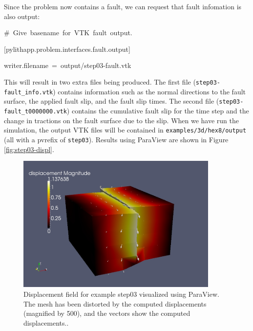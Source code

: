 Since the problem now contains a fault, we can request that fault
infomation is also output:
\begin{lyxcode}
\#~Give~basename~for~VTK~fault~output.

{[}pylithapp.problem.interfaces.fault.output{]}

writer.filename~=~output/step03-fault.vtk~
\end{lyxcode}
This will result in two extra files being produced. The first file
(\texttt{step03-fault\_info.vtk}) contains information such as the
normal directions to the fault surface, the applied fault slip, and
the fault slip times. The second file (\texttt{step03-fault\_t0000000.vtk})
contains the cumulative fault slip for the time step and the change
in tractions on the fault surface due to the slip. When we have run
the simulation, the output VTK files will be contained in \texttt{examples/3d/hex8/output}
(all with a pvrefix of \texttt{step03}). Results using ParaView are
shown in Figure \vref{fig:step03-displ}.
\begin{figure}
\centering{}\includegraphics[width=10cm]{tutorials/3dhex8/figs/step03-displ}\caption{Displacement field for example step03 visualized using ParaView. The
mesh has been distorted by the computed displacements (magnified by
500), and the vectors show the computed displacements.\label{fig:step03-displ}.}
\end{figure}

